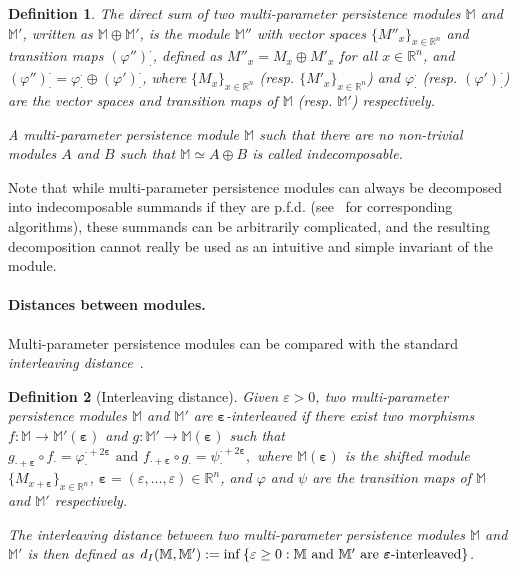 \documentclass{article}
\newcommand{\R}{\mathbb{R}}
\newcommand{\Mbb}{\mathbb{M}}
\newcommand{\disti}{{d_{\rm I}}}
\newtheorem{definition}{Definition}%
\newcommand{\rebuttal}[1]{{ #1}}
\begin{document}
\begin{definition}
	The {\em direct sum} of two multi-parameter persistence modules $\Mbb$ and
	$\Mbb'$, written as $\Mbb\oplus\Mbb'$, is the module $\Mbb''$ with vector spaces $ \{M''_x\}_{x\in\R^n}$ and transition maps $(\varphi'')_\cdot^\cdot$, defined as
	$M''_x = M_x\oplus M'_x$ for all $x\in\R^n$, and $(\varphi'')_\cdot^\cdot = \varphi_\cdot^\cdot \oplus (\varphi')_\cdot^\cdot$,
	where $ \{M_x\}_{x\in\R^n}$ (resp. $ \{M'_x\}_{x\in\R^n}$) and $\varphi_\cdot^\cdot$ (resp. $(\varphi')_\cdot^\cdot$) are the vector spaces and transition maps of $\Mbb$ (resp. $\Mbb'$) respectively.

	A multi-parameter persistence module $\Mbb$ such that there are no non-trivial modules $A$ and $B$ such that $\Mbb\simeq A \oplus B$ is called {\em indecomposable}. \\
\end{definition}

Note that while multi-parameter persistence modules can always be decomposed
into indecomposable summands \rebuttal{if they are p.f.d.}
(see~\cite{deyGeneralizedPersistenceAlgorithm2022,
deyDecomposingMultiparameterPersistence2025} for corresponding algorithms),
these summands can be arbitrarily complicated, and the resulting decomposition cannot really be used as an intuitive and simple invariant of the module.

\paragraph*{Distances between modules.}
Multi-parameter persistence modules can be compared with the standard {\em interleaving distance}~\cite{lesnickTheoryInterleavingDistance2015}. \\


\begin{definition}[Interleaving distance]\label{def:interleaving_distance}
	Given $ \varepsilon>0$, two multi-parameter persistence
	modules $\Mbb$ and $\Mbb'$ are {\em $\boldsymbol\varepsilon$-interleaved} if there exist
	two morphisms $f \colon \Mbb \to \Mbb'( \boldsymbol\varepsilon)$ and $g\colon \Mbb' \to
	\Mbb(\boldsymbol \varepsilon)$ such that
	$
	g_{\cdot+\boldsymbol \varepsilon} \circ f_\cdot = \varphi_{\cdot}^{\cdot + 2
	\boldsymbol \varepsilon} \text{ and } f_{\cdot+\boldsymbol\varepsilon}\circ g_\cdot =
	\psi_{\cdot}^{\cdot + 2 \boldsymbol\varepsilon},
	$
	where $\Mbb(\boldsymbol\varepsilon)$ is the {\em shifted module} $\{M_{x+\boldsymbol\varepsilon}\}_{x\in\R^n}$, $\boldsymbol\varepsilon = ( \varepsilon, \dots, \varepsilon)\in\R^n$,
	and $\varphi$ and $ \psi$ are the transition maps of $\Mbb$ and $\Mbb'$ respectively.

	The {\em interleaving distance} between two multi-parameter persistence modules $\Mbb$ and $\Mbb'$ is then defined as
	$
	\disti (\Mbb,\Mbb') := \inf \left\{  \varepsilon \ge 0 : \Mbb \text{ and } \Mbb'
	\text{ are } \boldsymbol\varepsilon\text{-interleaved}\right\}
	$. \\
\end{definition}
\end{document}
